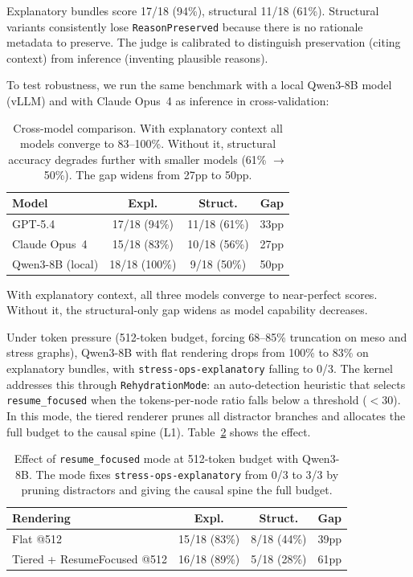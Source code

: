 \documentclass[11pt]{article}
\begin{document}
Explanatory bundles score 17/18 (94\%), structural 11/18 (61\%). Structural
variants consistently lose \texttt{ReasonPreserved} because there is no
rationale metadata to preserve. The judge is calibrated to distinguish
preservation (citing context) from inference (inventing plausible reasons).

To test robustness, we run the same benchmark with a local Qwen3-8B model
(vLLM) and with Claude Opus~4 as inference in cross-validation:

\begin{table}[h]
\centering\small
\begin{tabular}{lccc}
\toprule
Model & Expl. & Struct. & Gap \\
\midrule
GPT-5.4          & 17/18 (94\%) & 11/18 (61\%) & 33pp \\
Claude Opus~4    & 15/18 (83\%) & 10/18 (56\%) & 27pp \\
Qwen3-8B (local) & 18/18 (100\%) & 9/18 (50\%) & 50pp \\
\bottomrule
\end{tabular}
\caption{Cross-model comparison. With explanatory context all models converge
to 83--100\%. Without it, structural accuracy degrades further with smaller
models (61\% $\to$ 50\%). The gap widens from 27pp to 50pp.}
\label{tab:crossmodel}
\end{table}

With explanatory context, all three models converge to near-perfect scores.
Without it, the structural-only gap widens as model capability decreases.

Under token pressure (512-token budget, forcing 68--85\% truncation on
meso and stress graphs), Qwen3-8B with flat rendering drops from 100\% to
83\% on explanatory bundles, with \texttt{stress-ops-explanatory} falling to
0/3. The kernel addresses this through \texttt{RehydrationMode}: an
auto-detection heuristic that selects \texttt{resume\_focused} when the
tokens-per-node ratio falls below a threshold ($<$30). In this mode, the
tiered renderer prunes all distractor branches and allocates the full budget
to the causal spine (L1). Table~\ref{tab:modecomparison} shows the effect.

\begin{table}[h]
\centering\small
\begin{tabular}{lccc}
\toprule
Rendering & Expl. & Struct. & Gap \\
\midrule
Flat @512             & 15/18 (83\%) & 8/18 (44\%) & 39pp \\
Tiered + ResumeFocused @512 & 16/18 (89\%) & 5/18 (28\%) & 61pp \\
\bottomrule
\end{tabular}
\caption{Effect of \texttt{resume\_focused} mode at 512-token budget with
Qwen3-8B. The mode fixes \texttt{stress-ops-explanatory} from 0/3 to 3/3
by pruning distractors and giving the causal spine the full budget.}
\label{tab:modecomparison}
\end{table}
\end{document}

